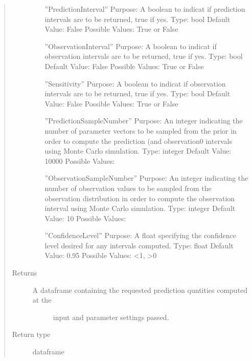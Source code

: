 \documentclass[letterpaper,10pt,english,openany,oneside]{sphinxmanual}
\begin{document}
\begin{fulllineitems}
\begin{fulllineitems}
\begin{quote}
\begin{description}
\begin{itemize}
”PredictionInterval” \textendash{}
Purpose: A boolean to indicat if prediction intervals are to be returned, true if yes.
Type: bool
Default Value: False
Possible Values: True or False

”ObservationInterval” \textendash{}
Purpose: A boolean to indicat if observation intervals are to be returned, true if yes.
Type: bool
Default Value: False
Possible Values: True or False

”Sensitivity” \textendash{}
Purpose: A boolean to indicat if observation intervals are to be returned, true if yes.
Type: bool
Default Value: False
Possible Values: True or False

”PredictionSampleNumber” \textendash{}
Purpose: An integer indicating the number of parameter vectors to be sampled from
the prior in order to compute the prediction (and observation0 intervals using Monte
Carlo simulation.
Type: integer
Default Value: 10000
Possible Values:

”ObservationSampleNumber” \textendash{}
Purpose: An integer indicating the number of observation values to be sampled from
the observation distribution in order to compute the observation interval using
Monte Carlo simulation.
Type: integer
Default Value: 10
Possible Values:

”ConfidenceLevel” \textendash{}
Purpose: A float specifying the confidence level desired for any intervals computed.
Type: float
Default Value: 0.95
Possible Values: \textless{}1, \textgreater{}0


\end{itemize}

\item[{Returns}] \leavevmode
\begin{description}
\item[{A dataframe containing the requested prediction quntities computed at the}] \leavevmode
input and parameter settings passed.

\end{description}


\item[{Return type}] \leavevmode
dataframe

\end{description}\end{quote}

\end{fulllineitems}



\end{fulllineitems}
\end{document}
